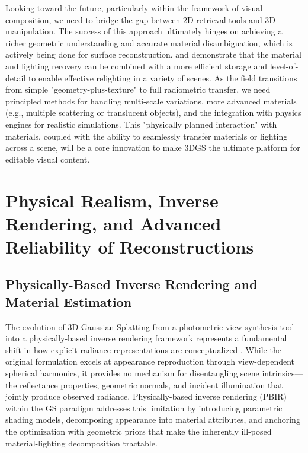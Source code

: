 \documentclass[11pt,a4paper]{article}
\begin{document}
Looking toward the future, particularly within the framework of visual composition, we need to bridge the gap between 2D retrieval tools and 3D manipulation. The success of this approach ultimately hinges on achieving a richer geometric understanding and accurate material disambiguation, which is actively being done for surface reconstruction. \cite{arxiv:2410.24204v3} and \cite{arxiv:2411.06976v2} demonstrate that the material and lighting recovery can be combined with a more efficient storage and level-of-detail to enable effective relighting in a variety of scenes. As the field transitions from simple "geometry-plus-texture" to full radiometric transfer, we need principled methods for handling multi-scale variations, more advanced materials (e.g., multiple scattering or translucent objects), and the integration with physics engines for realistic simulations. This "physically planned interaction" with materials, coupled with the ability to seamlessly transfer materials or lighting across a scene, will be a core innovation to make 3DGS the ultimate platform for editable visual content. 


\section{Physical Realism, Inverse Rendering, and Advanced Reliability of Reconstructions}



\subsection{Physically-Based Inverse Rendering and Material Estimation}


The evolution of 3D Gaussian Splatting from a photometric view-synthesis tool into a physically-based inverse rendering framework represents a fundamental shift in how explicit radiance representations are conceptualized \cite{arxiv:2308.04079v1}. While the original formulation excels at appearance reproduction through view-dependent spherical harmonics, it provides no mechanism for disentangling scene intrinsics---the reflectance properties, geometric normals, and incident illumination that jointly produce observed radiance. Physically-based inverse rendering (PBIR) within the GS paradigm addresses this limitation by introducing parametric shading models, decomposing appearance into material attributes, and anchoring the optimization with geometric priors that make the inherently ill-posed material-lighting decomposition tractable.
\end{document}
